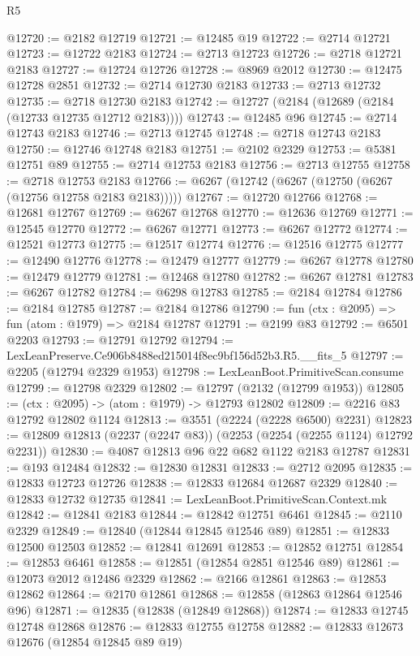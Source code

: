 \begin{lexlean}{R5}
\begin{coremodule}
@12720 := @2182 @12719
@12721 := @12485 @19
@12722 := @2714 @12721
@12723 := @12722 @2183
@12724 := @2713 @12723
@12726 := @2718 @12721 @2183
@12727 := @12724 @12726
@12728 := @8969 @2012
@12730 := @12475 @12728 @2851
@12732 := @2714 @12730 @2183
@12733 := @2713 @12732
@12735 := @2718 @12730 @2183
@12742 := @12727 (@2184 (@12689 (@2184 (@12733 @12735 @12712 @2183))))
@12743 := @12485 @96
@12745 := @2714 @12743 @2183
@12746 := @2713 @12745
@12748 := @2718 @12743 @2183
@12750 := @12746 @12748 @2183
@12751 := @2102 @2329
@12753 := @5381 @12751 @89
@12755 := @2714 @12753 @2183
@12756 := @2713 @12755
@12758 := @2718 @12753 @2183
@12766 := @6267 (@12742 (@6267 (@12750 (@6267 (@12756 @12758 @2183 @2183)))))
@12767 := @12720 @12766
@12768 := @12681 @12767
@12769 := @6267 @12768
@12770 := @12636 @12769
@12771 := @12545 @12770
@12772 := @6267 @12771
@12773 := @6267 @12772
@12774 := @12521 @12773
@12775 := @12517 @12774
@12776 := @12516 @12775
@12777 := @12490 @12776
@12778 := @12479 @12777
@12779 := @6267 @12778
@12780 := @12479 @12779
@12781 := @12468 @12780
@12782 := @6267 @12781
@12783 := @6267 @12782
@12784 := @6298 @12783
@12785 := @2184 @12784
@12786 := @2184 @12785
@12787 := @2184 @12786
@12790 := fun (ctx : @2095) => fun (atom : @1979) => @2184 @12787
@12791 := @2199 @83
@12792 := @6501 @2203
@12793 := @12791 @12792
@12794 := LexLeanPreserve.Ce906b8488ed215014f8ec9bf156d52b3.R5.__fits_5
@12797 := @2205 (@12794 @2329 @1953)
@12798 := LexLeanBoot.PrimitiveScan.consume
@12799 := @12798 @2329
@12802 := @12797 (@2132 (@12799 @1953))
@12805 := (ctx : @2095) -> (atom : @1979) -> @12793 @12802
@12809 := @2216 @83 @12792 @12802 @1124
@12813 := @3551 (@2224 (@2228 @6500) @2231)
@12823 := @12809 @12813 (@2237 (@2247 @83)) (@2253 (@2254 (@2255 @1124) @12792 @2231))
@12830 := @4087 @12813 @96 @22 @682 @1122 @2183 @12787
@12831 := @193 @12484
@12832 := @12830 @12831
@12833 := @2712 @2095
@12835 := @12833 @12723 @12726
@12838 := @12833 @12684 @12687 @2329
@12840 := @12833 @12732 @12735
@12841 := LexLeanBoot.PrimitiveScan.Context.mk
@12842 := @12841 @2183
@12844 := @12842 @12751 @6461
@12845 := @2110 @2329
@12849 := @12840 (@12844 @12845 @12546 @89)
@12851 := @12833 @12500 @12503
@12852 := @12841 @12691
@12853 := @12852 @12751
@12854 := @12853 @6461
@12858 := @12851 (@12854 @2851 @12546 @89)
@12861 := @12073 @2012 @12486 @2329
@12862 := @2166 @12861
@12863 := @12853 @12862
@12864 := @2170 @12861
@12868 := @12858 (@12863 @12864 @12546 @96)
@12871 := @12835 (@12838 (@12849 @12868))
@12874 := @12833 @12745 @12748 @12868
@12876 := @12833 @12755 @12758
@12882 := @12833 @12673 @12676 (@12854 @12845 @89 @19)

\end{coremodule}
\end{lexlean}
